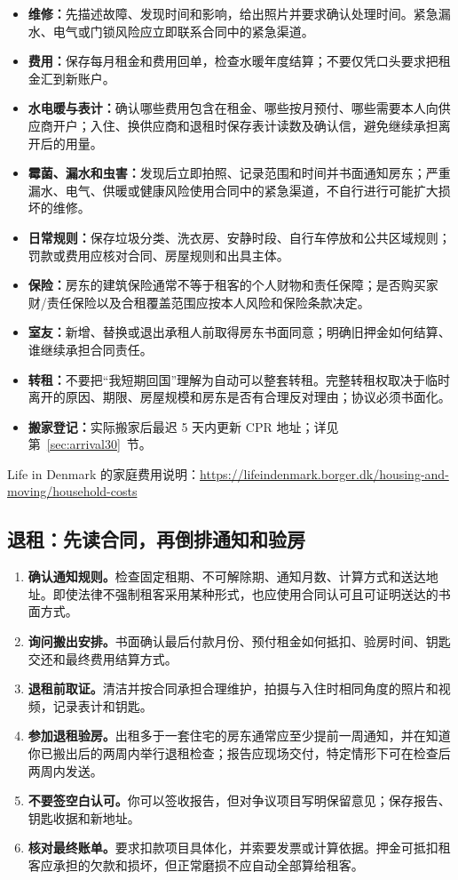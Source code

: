 \begin{itemize}[leftmargin=2em,itemsep=3pt]
  \item \textbf{维修：}先描述故障、发现时间和影响，给出照片并要求确认处理时间。紧急漏水、电气或门锁风险应立即联系合同中的紧急渠道。
  \item \textbf{费用：}保存每月租金和费用回单，检查水暖年度结算；不要仅凭口头要求把租金汇到新账户。
  \item \textbf{水电暖与表计：}确认哪些费用包含在租金、哪些按月预付、哪些需要本人向供应商开户；入住、换供应商和退租时保存表计读数及确认信，避免继续承担离开后的用量。
  \item \textbf{霉菌、漏水和虫害：}发现后立即拍照、记录范围和时间并书面通知房东；严重漏水、电气、供暖或健康风险使用合同中的紧急渠道，不自行进行可能扩大损坏的维修。
  \item \textbf{日常规则：}保存垃圾分类、洗衣房、安静时段、自行车停放和公共区域规则；罚款或费用应核对合同、房屋规则和出具主体。
  \item \textbf{保险：}房东的建筑保险通常不等于租客的个人财物和责任保障；是否购买家财/责任保险以及合租覆盖范围应按本人风险和保险条款决定。
  \item \textbf{室友：}新增、替换或退出承租人前取得房东书面同意；明确旧押金如何结算、谁继续承担合同责任。
  \item \textbf{转租：}不要把“我短期回国”理解为自动可以整套转租。完整转租权取决于临时离开的原因、期限、房屋规模和房东是否有合理反对理由；协议必须书面化。
  \item \textbf{搬家登记：}实际搬家后最迟 5 天内更新 CPR 地址；详见第~\ref{sec:arrival30}~节。
\end{itemize}

Life in Denmark 的家庭费用说明：\url{https://lifeindenmark.borger.dk/housing-and-moving/household-costs}

\subsection{退租：先读合同，再倒排通知和验房}

\begin{enumerate}[leftmargin=2.2em,itemsep=3pt]
  \item \textbf{确认通知规则。}检查固定租期、不可解除期、通知月数、计算方式和送达地址。即使法律不强制租客采用某种形式，也应使用合同认可且可证明送达的书面方式。
  \item \textbf{询问搬出安排。}书面确认最后付款月份、预付租金如何抵扣、验房时间、钥匙交还和最终费用结算方式。
  \item \textbf{退租前取证。}清洁并按合同承担合理维护，拍摄与入住时相同角度的照片和视频，记录表计和钥匙。
  \item \textbf{参加退租验房。}出租多于一套住宅的房东通常应至少提前一周通知，并在知道你已搬出后的两周内举行退租检查；报告应现场交付，特定情形下可在检查后两周内发送。
  \item \textbf{不要签空白认可。}你可以签收报告，但对争议项目写明保留意见；保存报告、钥匙收据和新地址。
  \item \textbf{核对最终账单。}要求扣款项目具体化，并索要发票或计算依据。押金可抵扣租客应承担的欠款和损坏，但正常磨损不应自动全部算给租客。
\end{enumerate}

